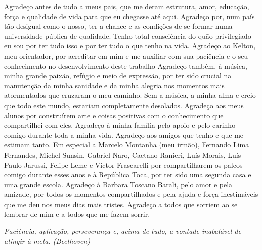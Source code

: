 \documentclass[
	12pt,				%
	openright,			%
	oneside,			%
	a4paper,			%
	english,			%
	french,				%
	spanish,			%
	brazil				%
	]{abntex2}
\begin{document}
\begin{agradecimentos}
Agradeço antes de tudo a meus pais, que me deram estrutura, amor, educação, força e qualidade de vida para que eu chegasse até aqui.
Agradeço por, num país tão desigual como o nosso, ter a chance e as condições de se formar numa universidade pública de qualidade. Tenho total consciência do quão privilegiado eu sou por ter tudo isso e por ter tudo o que tenho na vida.
Agradeço ao Kelton, meu orientador, por acreditar em mim e me auxiliar com sua paciência e o seu conhecimento no desenvolvimento deste trabalho
Agradeço também, à música, minha grande paixão, refúgio e meio de expressão, por ter sido crucial na manutenção da minha sanidade e da minha alegria nos momentos mais atormentados que cruzaram o meu caminho. Sem a música, a minha alma e creio que todo este mundo, estariam completamente desolados. Agradeço aos meus alunos por construírem arte e coisas positivas com o conhecimento que compartilhei com eles.
Agradeço à minha família pelo apoio e pelo carinho comigo durante toda a minha vida.
Agradeço aos amigos que tenho e que me estimam tanto. Em especial a Marcelo Montanha (meu irmão), Fernando Lima Fernandes, Michel Sunsin, Gabriel Naro, Caetano Ranieri, Luís Morais, Luís Paulo Jarussi, Felipe Leme e Victor Frascarelli por compartilharem os palcos comigo durante esses anos e à República Toca, por ter sido uma segunda casa e uma grande escola.
Agradeço à Barbara Toscano Barali, pelo amor e pela amizade, por todos os momentos compartilhados e pela ajuda e força inestimáveis que me deu nos meus dias mais tristes.
Agradeço a todos que sorriem ao se lembrar de mim e a todos que me fazem sorrir.
\end{agradecimentos}

\begin{epigrafe}
    \vspace*{\fill}
	\begin{flushright}
		\textit{Paciência, aplicação, perseverança e, acima de tudo, a vontade inabalável de atingir à meta. (Beethoven)}
	\end{flushright}
\end{epigrafe}

\end{document}
